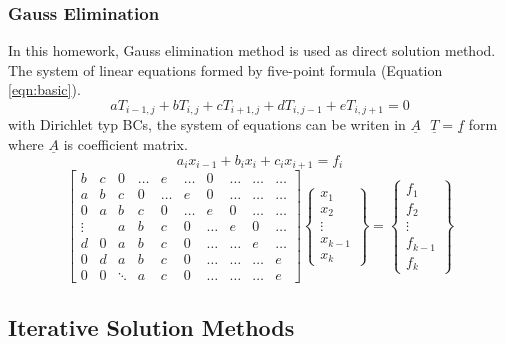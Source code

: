 \documentclass[letterpaper,12pt]{article}
\begin{document}
\subsubsection{Gauss Elimination}
In this homework, Gauss elimination method is used as direct solution method. The system of linear
equations formed by five-point formula (Equation \ref{eqn:basic}).
\begin{equation}
	aT_{i-1,j}+bT_{i,j}+cT_{i+1,j}+dT_{i,j-1}+eT_{i,j+1}=0
\end{equation}
with Dirichlet typ BCs, the system of equations can be writen in $\underline{A}\mbox{ }\underline{T}=\underline{f}$ form
where $\underline{A}$ is coefficient matrix.
\begin{equation}
	a_i x_{i-1}+b_i x_i+c_i x_{i+1}=f_i
\end{equation}
\begin{equation}
	\begin{bmatrix}
		b     & c    & 0    &\dots & e   &\dots &0    &\dots &\dots&\dots \\
		a     & b    & c    &0    &\dots &e     & 0   &\dots &\dots&\dots \\
		0     & a    & b    &c    & 0   &\dots &e    &0    &\dots&\dots \\
		\vdots&    & a    &b    & c   & 0    &\dots &e    &0    &\dots \\
		d     & 0    & a    &b    & c   & 0    &\dots &\dots &e    &\dots \\
		0     & d    & a    &b    & c   & 0    &\dots &\dots &\dots &e     \\
		0     & 0    &\ddots &a    & c   & 0    &\dots &\dots &\dots &e      
		\end{bmatrix}
	\begin{Bmatrix}
		x_1\\
		x_2\\
		\vdots\\
		x_{k-1}\\
		x_k
		\end{Bmatrix}
	=
	\begin{Bmatrix}
		f_1\\
		f_2\\
		\vdots\\
		f_{k-1}\\
		f_k
	\end{Bmatrix}
	\label{eqn:matrx}
\end{equation}

\subsection{Iterative Solution Methods}
\end{document}
